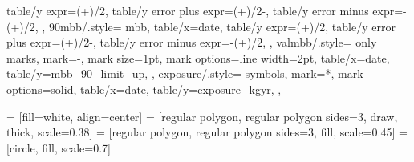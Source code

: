 {{    table/y expr={(+)/2},
    table/y error plus expr={(+)/2-},
    table/y error minus expr={-(+)/2},
  },
  90mbb/.style={%
    mbb,
    table/x=date,
    table/y expr={(+)/2},
    table/y error plus expr={(+)/2-},
    table/y error minus expr={-(+)/2},
  },
  valmbb/.style={%
    only marks,
    mark=-,
    mark size=1pt,
    mark options={line width=2pt},
    table/x=date,
    table/y=mbb_90_limit_up,
  },
  exposure/.style={%
    symbols,
    mark=*,
    mark options={solid},
    table/x=date,
    table/y=exposure_kgyr,
  },
}

 = [fill=white, align=center]
 = [regular polygon, regular polygon sides=3, draw, thick, scale=0.38]
 = [regular polygon, regular polygon sides=3, fill, scale=0.45]
 = [circle, fill, scale=0.7]







